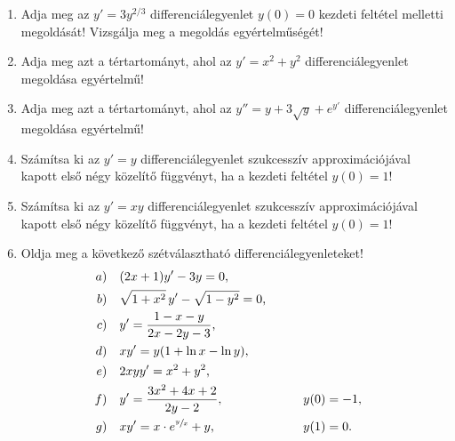 \documentclass{szb-practice}
\begin{document}
\begin{enumerate}
  \item Adja meg az $y' = 3y^{2/3}$ differenciálegyenlet $y(0) = 0$ kezdeti
        feltétel melletti megoldását! Vizsgálja meg a megoldás egyértelműségét!

  \item Adja meg azt a tértartományt, ahol az $y' = x^2 + y^2$
        differenciálegyenlet megoldása egyértelmű!

  \item Adja meg azt a tértartományt, ahol az $y'' = y + 3 \sqrt{y} + e^{y'}$
        differenciálegyenlet megoldása egyértelmű!

  \item Számítsa ki az $y' = y$ differenciálegyenlet szukcesszív
        approximációjával kapott első négy közelítő függvényt, ha a kezdeti
        feltétel $y(0) = 1$!

  \item Számítsa ki az $y' = xy$ differenciálegyenlet szukcesszív
        approximációjával kapott első négy közelítő függvényt, ha a kezdeti
        feltétel $y(0) = 1$!

  \item Oldja meg a következő szétválasztható differenciálegyenleteket!
        \begin{alignat*}{9}
          a & ) \quad (2x + 1) y' - 3y = 0
          \text,                                                            \\
          b & ) \quad \sqrt{1 + x^2} \, y' - \sqrt{1 - y^2} = 0
          \text,                                                            \\
          c & ) \quad y' = \frac{1 - x - y}{2x - 2y - 3}
          \text,                                                            \\
          d & ) \quad xy' = y(1 + \ln x - \ln y)
          \text,                                                            \\
          e & ) \quad 2xyy' = x^2 + y^2
          \text,                                                            \\
          f & ) \quad y' = \frac{3x^2 + 4x + 2}{2y - 2}
          \text,
            & \qquad                                            & y(0) = -1
          \text,                                                            \\
          g & ) \quad xy' = x \cdot e^{\sfrac{y}{x}} + y
          \text,
            & \qquad                                            & y(1) = 0
          \text.
        \end{alignat*}


\end{enumerate}
\end{document}
